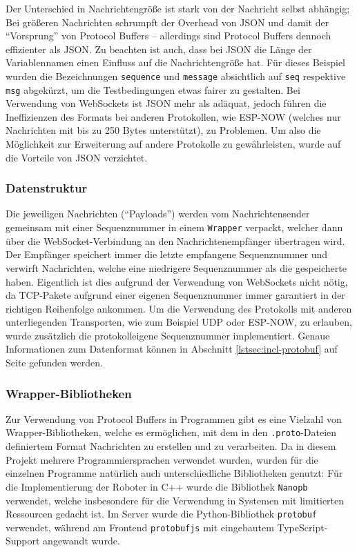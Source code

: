 Der Unterschied in Nachrichtengröße ist stark von der Nachricht selbst abhängig;
Bei größeren Nachrichten schrumpft der Overhead von JSON
und damit der ``Vorsprung'' von Protocol Buffers --
allerdings sind Protocol Buffers dennoch effizienter als JSON.
%
Zu beachten ist auch,
dass bei JSON die Länge der Variablennamen einen Einfluss auf die Nachrichtengröße hat.
%
Für dieses Beispiel wurden die Bezeichnungen \texttt{sequence} und \texttt{message} absichtlich auf
\texttt{seq} respektive \texttt{msg} abgekürzt,
um die Testbedingungen etwas fairer zu gestalten.
%
Bei Verwendung von WebSockets ist JSON mehr als adäquat,
jedoch führen die Ineffizienzen des Formats bei anderen Protokollen,
wie ESP-NOW \cite{esp-now} (welches nur Nachrichten mit bis zu 250 Bytes unterstützt),
zu Problemen.
%
Um also die Möglichkeit zur Erweiterung auf andere Protokolle zu gewährleisten,
wurde auf die Vorteile von JSON verzichtet.

\subsubsection{Datenstruktur}
Die jeweiligen Nachrichten (``Payloads'')
werden vom Nachrichtensender gemeinsam mit einer Sequenznummer in einem \texttt{Wrapper} verpackt,
welcher dann über die WebSocket-Verbindung an den Nachrichtenempfänger übertragen wird.
%
Der Empfänger speichert immer die letzte empfangene Sequenznummer
und verwirft Nachrichten,
welche eine niedrigere Sequenznummer als die gespeicherte haben.
%
Eigentlich ist dies aufgrund der Verwendung von WebSockets nicht nötig,
da TCP-Pakete aufgrund einer eigenen Sequenznummer immer garantiert in der richtigen Reihenfolge ankommen.
%
Um die Verwendung des Protokolls mit anderen unterliegenden Transporten,
wie zum Beispiel UDP oder ESP-NOW,
zu erlauben,
wurde zusätzlich die protokolleigene Sequenznummer implementiert.
%
Genaue Informationen zum Datenformat können in Abschnitt
\ref{lstsec:incl-protobuf} auf Seite
\pageref{lstsec:incl-protobuf} gefunden werden.

\subsubsection{Wrapper-Bibliotheken}
Zur Verwendung von Protocol Buffers in Programmen gibt es eine Vielzahl von Wrapper-Bibliotheken,
welche es ermöglichen,
mit dem in den \texttt{.proto}-Dateien definiertem Format
Nachrichten zu erstellen und zu verarbeiten.
%
Da in diesem Projekt mehrere Programmiersprachen verwendet wurden,
wurden für die einzelnen Programme natürlich auch unterschiedliche Bibliotheken genutzt:
%
Für die Implementierung der Roboter in C++ wurde die Bibliothek \texttt{Nanopb} verwendet,
welche insbesondere für die Verwendung in Systemen mit limitierten Ressourcen gedacht ist.
%
Im Server wurde die Python-Bibliothek \texttt{protobuf} verwendet,
während am Frontend \texttt{protobufjs} mit eingebautem TypeScript-Support angewandt wurde.

